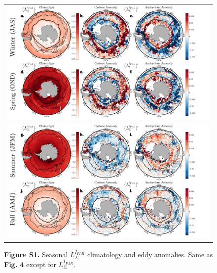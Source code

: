 \documentclass{article}
\begin{document}
\begin{figure}[!htbp]
 \begin{adjustwidth}{-1.2in}{-1.2in}
 \centering
  \begin{tabular}{c }
        \includegraphics[scale=.5]{FigS4a.pdf} \\
        \includegraphics[scale=.5]{FigS4b.pdf} \\
  \end{tabular}
 \end{adjustwidth}
\caption[S1. Seasonal  $L_\Sigma^{I_{PAR}}'$ climatology and eddy anomalies. ]
{\textbf{Figure S1.} Seasonal  $L_\Sigma^{I_{PAR}}$ climatology and eddy anomalies. Same as \textbf{Fig. 4} except for $L_\Sigma^{I_{PAR}}$.
}
\label{fig:FigS1}
\end{figure}


\end{document}
